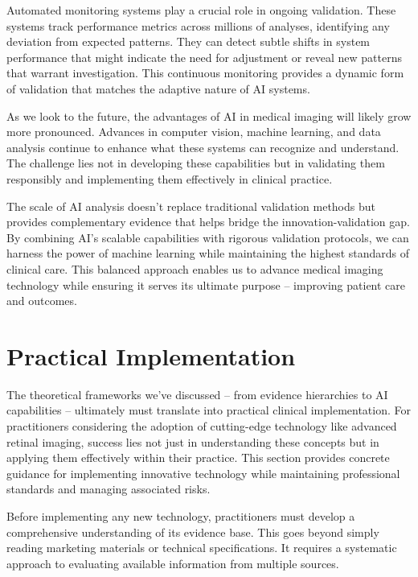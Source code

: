 \documentclass[
  Letterpaper,
]{scrbook}
\begin{document}
Automated monitoring systems play a crucial role in ongoing validation.
These systems track performance metrics across millions of analyses,
identifying any deviation from expected patterns. They can detect subtle
shifts in system performance that might indicate the need for adjustment
or reveal new patterns that warrant investigation. This continuous
monitoring provides a dynamic form of validation that matches the
adaptive nature of AI systems.

As we look to the future, the advantages of AI in medical imaging will
likely grow more pronounced. Advances in computer vision, machine
learning, and data analysis continue to enhance what these systems can
recognize and understand. The challenge lies not in developing these
capabilities but in validating them responsibly and implementing them
effectively in clinical practice.

The scale of AI analysis doesn't replace traditional validation methods
but provides complementary evidence that helps bridge the
innovation-validation gap. By combining AI's scalable capabilities with
rigorous validation protocols, we can harness the power of machine
learning while maintaining the highest standards of clinical care. This
balanced approach enables us to advance medical imaging technology while
ensuring it serves its ultimate purpose -- improving patient care and
outcomes.

\section{Practical Implementation}\label{practical-implementation-1}

The theoretical frameworks we've discussed -- from evidence hierarchies
to AI capabilities -- ultimately must translate into practical clinical
implementation. For practitioners considering the adoption of
cutting-edge technology like advanced retinal imaging, success lies not
just in understanding these concepts but in applying them effectively
within their practice. This section provides concrete guidance for
implementing innovative technology while maintaining professional
standards and managing associated risks.

Before implementing any new technology, practitioners must develop a
comprehensive understanding of its evidence base. This goes beyond
simply reading marketing materials or technical specifications. It
requires a systematic approach to evaluating available information from
multiple sources.
\end{document}
